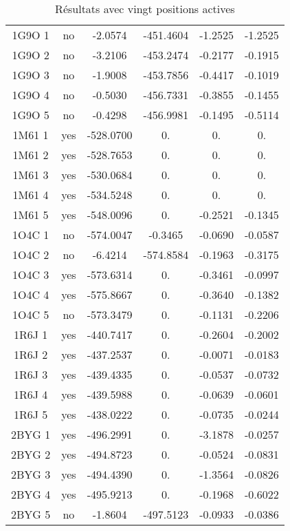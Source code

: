 \begin{table}[h]
{\begin{tabular}{cccccc}
        1G9O 1 & no   &  -2.0574   & -451.4604  & -1.2525 & -1.2525 \\ 
        1G9O 2 & no   &  -3.2106   & -453.2474  & -0.2177 & -0.1915 \\ 
        1G9O 3 & no   &  -1.9008   & -453.7856  & -0.4417 & -0.1019 \\ 
        1G9O 4 & no   &  -0.5030   & -456.7331  & -0.3855 & -0.1455 \\ 
        1G9O 5 & no   &  -0.4298   & -456.9981  & -0.1495 & -0.5114 \\ 
        1M61 1 & yes  & -528.0700 & 0.          & 0.      & 0. \\               
        1M61 2 & yes  & -528.7653 & 0.          & 0.      & 0. \\               
        1M61 3 & yes  & -530.0684 & 0.           & 0.      & 0. \\               
        1M61 4 & yes  & -534.5248 & 0.           & 0.     & 0.\\               
        1M61 5 & yes  & -548.0096 & 0.           & -0.2521 & -0.1345 \\     
        1O4C 1 & no   &  -574.0047 & -0.3465     & -0.0690 & -0.0587 \\    
        1O4C 2 & no   &  -6.4214   & -574.8584   & -0.1963 & -0.3175 \\         
        1O4C 3 & yes  & -573.6314 &  0.          & -0.3461 & -0.0997 \\             
        1O4C 4 & yes  & -575.8667 &  0.          & -0.3640 & -0.1382 \\             
        1O4C 5 & no   & -573.3479 &  0.          & -0.1131 & -0.2206 \\      
        1R6J 1 & yes  & -440.7417 &  0.          & -0.2604 & -0.2002 \\        
        1R6J 2 & yes  & -437.2537 &  0.          & -0.0071 & -0.0183 \\        
        1R6J 3 & yes  & -439.4335 &  0.          & -0.0537 & -0.0732 \\       
        1R6J 4 & yes  & -439.5988 &  0.          & -0.0639 & -0.0601 \\        
        1R6J 5 & yes  & -438.0222 &  0.          & -0.0735 & -0.0244 \\        
        2BYG 1 & yes  & -496.2991 &  0.          & -3.1878 & -0.0257 \\        
        2BYG 2 & yes  & -494.8723 &  0.          & -0.0524 & -0.0831 \\        
        2BYG 3 & yes  & -494.4390 &  0.          & -1.3564 & -0.0826 \\        
        2BYG 4 & yes  & -495.9213 &  0.          & -0.1968 & -0.6022 \\        
        2BYG 5 & no   &  -1.8604   & -497.5123   & -0.0933 & -0.0386 \\   
       \bottomrule


 \end{tabular}
}   
 \caption{Résultats  avec vingt positions actives }
\label{tab:result_20_actives}   
\end{table}


